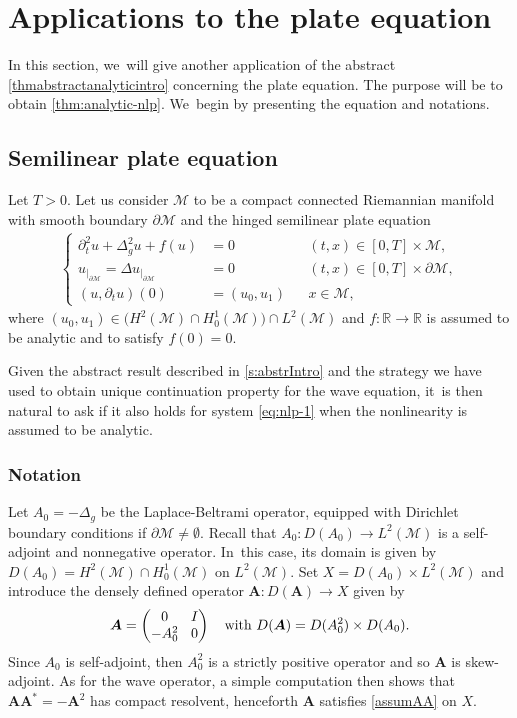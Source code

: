 \documentclass[JEP,XML,SOM,Unicode,published]{cedram}
\theoremstyle{definition}
\let\mc\mathcal
\newcommand{\M}{\mc{M}}
\newcommand{\R}{\mathbb{R}}
\newcommand{\bA}{\boldsymbol{A}}
\begin{document}
\section{Applications to the plate equation}\label{s:plate}
In this section, we~will give another application of the abstract \cref{thmabstractanalyticintro} concerning the plate equation. The purpose will be to obtain \cref{thm:analytic-nlp}. We~begin by presenting the equation and notations.
\subsection{Semilinear plate equation} Let $T>0$. Let us consider $\M$ to be a compact connected Riemannian manifold with smooth boundary $\partial\M$ and the hinged semilinear plate equation\vspace*{-3pt}
\begin{align}\label{eq:nlp-1}
\left\{\begin{aligned}
\partial_t^2 u+\Delta_g^2 u+f(u)&=0 &&(t, x)\in [0, T]\times \M,\\
u_{|_{\partial\M}}=\Delta u_{|_{\partial\M}}&=0 &&(t, x)\in [0, T]\times\partial\M,\\
(u, \partial_t u)(0)&=(u_0, u_1) &&x\in \M,
\end{aligned}\right.
\end{align}
where $(u_0, u_1)\in \big(H^2(\M)\cap H_0^1(\M)\big)\cap L^2(\M)$ and $f: \R\to \R$ is assumed to be analytic and to satisfy $f(0)=0$.

Given the abstract result described in \cref{s:abstrIntro} and the strategy we have used to obtain unique continuation property for the wave equation, it~is then natural to ask if it also holds for system \eqref{eq:nlp-1} when the nonlinearity is assumed to be analytic.

\subsubsection{Notation}\label{notplate} Let $A_0=-\Delta_g$ be the Laplace-Beltrami operator, equipped with Dirichlet boundary conditions if $\partial\M\neq\emptyset$. Recall that $A_0: D(A_0)\to L^2(\M)$ is a self-adjoint and nonnegative operator. In~this case, its domain is given by $D(A_0)=H^2(\M)\cap H_0^1(\M)$ on $L^2(\M)$. Set $X=D(A_0)\times L^2(\M)$ and introduce the densely defined operator $\bA: D(\bA)\to X$ given by
\begin{align*}\arraycolsep4.5pt
\bA=\begin{pmatrix}
0 & I \\
-A_0^2 & 0
\end{pmatrix}\quad \text{with } D(\bA)=D(A_0^2)\times D(A_0).
\end{align*}
Since $A_0$ is self-adjoint, then $A_0^2$ is a strictly positive operator and so $\bA$ is skew-adjoint. As for the wave operator, a simple computation then shows that $\bA\bA^*=-\bA^2$ has compact resolvent, henceforth $\bA$ satisfies \cref{assumAA} on $X$.
\end{document}
